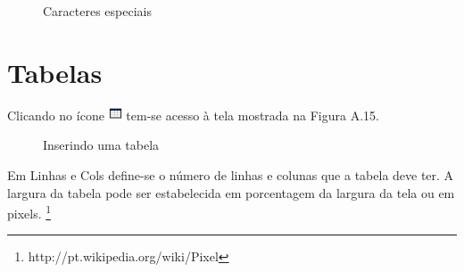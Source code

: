 \begin{figure}
 \begin{center}
  \caption{Caracteres especiais}
 \end{center}
\end{figure}

\section{Tabelas}


Clicando no ícone \includegraphics[width=0.4cm]{imagem/cap0/insert_table.jpg} tem-se acesso à tela mostrada na Figura A.15.

\begin{figure}
 \begin{center}
  \caption{Inserindo uma tabela}
 \end{center}
\end{figure}


Em Linhas e Cols define-se o número de linhas e colunas que a tabela deve ter. A largura da tabela pode ser estabelecida em porcentagem da largura da tela ou em pixels. \footnote{http://pt.wikipedia.org/wiki/Pixel}

